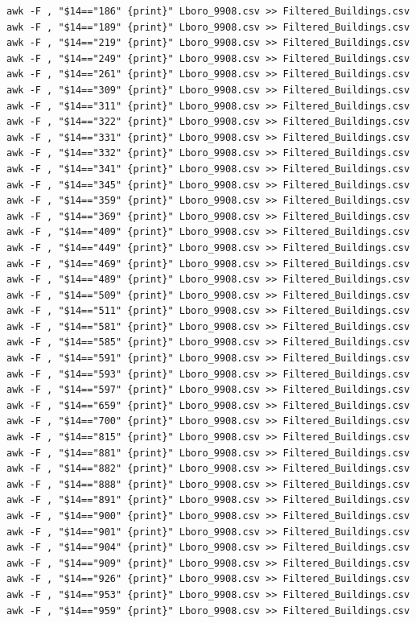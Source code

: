 \documentclass[table,a4paper,oneside]{book}
\begin{document}
\begin{singlespace}
\begin{lstlisting}
awk -F , "$14=="186" {print}" Lboro_9908.csv >> Filtered_Buildings.csv
awk -F , "$14=="189" {print}" Lboro_9908.csv >> Filtered_Buildings.csv
awk -F , "$14=="219" {print}" Lboro_9908.csv >> Filtered_Buildings.csv
awk -F , "$14=="249" {print}" Lboro_9908.csv >> Filtered_Buildings.csv
awk -F , "$14=="261" {print}" Lboro_9908.csv >> Filtered_Buildings.csv
awk -F , "$14=="309" {print}" Lboro_9908.csv >> Filtered_Buildings.csv
awk -F , "$14=="311" {print}" Lboro_9908.csv >> Filtered_Buildings.csv
awk -F , "$14=="322" {print}" Lboro_9908.csv >> Filtered_Buildings.csv
awk -F , "$14=="331" {print}" Lboro_9908.csv >> Filtered_Buildings.csv
awk -F , "$14=="332" {print}" Lboro_9908.csv >> Filtered_Buildings.csv
awk -F , "$14=="341" {print}" Lboro_9908.csv >> Filtered_Buildings.csv
awk -F , "$14=="345" {print}" Lboro_9908.csv >> Filtered_Buildings.csv
awk -F , "$14=="359" {print}" Lboro_9908.csv >> Filtered_Buildings.csv
awk -F , "$14=="369" {print}" Lboro_9908.csv >> Filtered_Buildings.csv
awk -F , "$14=="409" {print}" Lboro_9908.csv >> Filtered_Buildings.csv
awk -F , "$14=="449" {print}" Lboro_9908.csv >> Filtered_Buildings.csv
awk -F , "$14=="469" {print}" Lboro_9908.csv >> Filtered_Buildings.csv
awk -F , "$14=="489" {print}" Lboro_9908.csv >> Filtered_Buildings.csv
awk -F , "$14=="509" {print}" Lboro_9908.csv >> Filtered_Buildings.csv
awk -F , "$14=="511" {print}" Lboro_9908.csv >> Filtered_Buildings.csv
awk -F , "$14=="581" {print}" Lboro_9908.csv >> Filtered_Buildings.csv
awk -F , "$14=="585" {print}" Lboro_9908.csv >> Filtered_Buildings.csv
awk -F , "$14=="591" {print}" Lboro_9908.csv >> Filtered_Buildings.csv
awk -F , "$14=="593" {print}" Lboro_9908.csv >> Filtered_Buildings.csv
awk -F , "$14=="597" {print}" Lboro_9908.csv >> Filtered_Buildings.csv
awk -F , "$14=="659" {print}" Lboro_9908.csv >> Filtered_Buildings.csv
awk -F , "$14=="700" {print}" Lboro_9908.csv >> Filtered_Buildings.csv
awk -F , "$14=="815" {print}" Lboro_9908.csv >> Filtered_Buildings.csv
awk -F , "$14=="881" {print}" Lboro_9908.csv >> Filtered_Buildings.csv
awk -F , "$14=="882" {print}" Lboro_9908.csv >> Filtered_Buildings.csv
awk -F , "$14=="888" {print}" Lboro_9908.csv >> Filtered_Buildings.csv
awk -F , "$14=="891" {print}" Lboro_9908.csv >> Filtered_Buildings.csv
awk -F , "$14=="900" {print}" Lboro_9908.csv >> Filtered_Buildings.csv
awk -F , "$14=="901" {print}" Lboro_9908.csv >> Filtered_Buildings.csv
awk -F , "$14=="904" {print}" Lboro_9908.csv >> Filtered_Buildings.csv
awk -F , "$14=="909" {print}" Lboro_9908.csv >> Filtered_Buildings.csv
awk -F , "$14=="926" {print}" Lboro_9908.csv >> Filtered_Buildings.csv
awk -F , "$14=="953" {print}" Lboro_9908.csv >> Filtered_Buildings.csv
awk -F , "$14=="959" {print}" Lboro_9908.csv >> Filtered_Buildings.csv
\end{lstlisting}


\end{singlespace}
\end{document}
